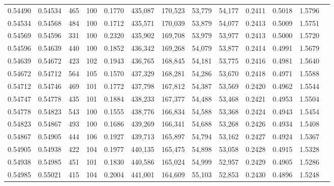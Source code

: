\begin{tabular}{rrrrrrrrrrrrr}
0.54490 & 0.54534 &   465 & 100 &                                     0.1770 & 435,087 & 170,523 &  53,779 &  54,177 & 0.2411 & 0.5018 & 1.5796 \\
0.54534 & 0.54568 &   484 & 100 &                                     0.1712 & 435,571 & 170,039 &  53,879 &  54,077 & 0.2413 & 0.5009 & 1.5751 \\
0.54569 & 0.54596 &   331 & 100 &                                     0.2320 & 435,902 & 169,708 &  53,979 &  53,977 & 0.2413 & 0.5000 & 1.5720 \\
0.54596 & 0.54639 &   440 & 100 &                                     0.1852 & 436,342 & 169,268 &  54,079 &  53,877 & 0.2414 & 0.4991 & 1.5679 \\
0.54639 & 0.54672 &   423 & 102 &                                     0.1943 & 436,765 & 168,845 &  54,181 &  53,775 & 0.2416 & 0.4981 & 1.5640 \\
0.54672 & 0.54712 &   564 & 105 &                                     0.1570 & 437,329 & 168,281 &  54,286 &  53,670 & 0.2418 & 0.4971 & 1.5588 \\
0.54712 & 0.54746 &   469 & 101 &                                     0.1772 & 437,798 & 167,812 &  54,387 &  53,569 & 0.2420 & 0.4962 & 1.5544 \\
0.54747 & 0.54778 &   435 & 101 &                                     0.1884 & 438,233 & 167,377 &  54,488 &  53,468 & 0.2421 & 0.4953 & 1.5504 \\
0.54778 & 0.54823 &   543 & 100 &                                     0.1555 & 438,776 & 166,834 &  54,588 &  53,368 & 0.2424 & 0.4943 & 1.5454 \\
0.54823 & 0.54867 &   493 & 100 &                                     0.1686 & 439,269 & 166,341 &  54,688 &  53,268 & 0.2426 & 0.4934 & 1.5408 \\
0.54867 & 0.54905 &   444 & 106 &                                     0.1927 & 439,713 & 165,897 &  54,794 &  53,162 & 0.2427 & 0.4924 & 1.5367 \\
0.54905 & 0.54938 &   422 & 104 &                                     0.1977 & 440,135 & 165,475 &  54,898 &  53,058 & 0.2428 & 0.4915 & 1.5328 \\
0.54938 & 0.54985 &   451 & 101 &                                     0.1830 & 440,586 & 165,024 &  54,999 &  52,957 & 0.2429 & 0.4905 & 1.5286 \\
0.54985 & 0.55021 &   415 & 104 &                                     0.2004 & 441,001 & 164,609 &  55,103 &  52,853 & 0.2430 & 0.4896 & 1.5248 \\

\end{tabular}
